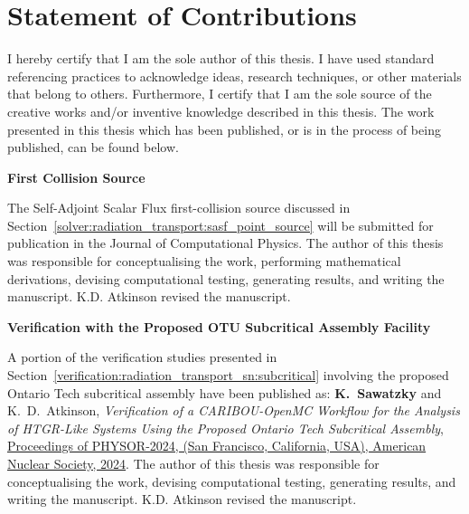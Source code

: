 \chapter*{Statement of Contributions}

I hereby certify that I am the sole author of this thesis. I have used standard referencing practices to acknowledge ideas, research techniques, or other materials that belong to others. Furthermore, I certify that I am the sole source of the creative works and/or inventive knowledge described in this thesis. The work presented in this thesis which has been published, or is in the process of being published, can be found below.

\noindent\textbf{First Collision Source}

The Self-Adjoint Scalar Flux first-collision source discussed in Section~\ref{solver:radiation_transport:sasf_point_source} will be submitted for publication in the Journal of Computational Physics. The author of this thesis was responsible for conceptualising the work, performing mathematical derivations, devising computational testing, generating results, and writing the manuscript. K.D. Atkinson revised the manuscript.

\noindent\textbf{Verification with the Proposed OTU Subcritical Assembly Facility}

A portion of the verification studies presented in Section~\ref{verification:radiation_transport_sn:subcritical} involving the proposed Ontario Tech subcritical assembly have been published as: \textbf{K.\ Sawatzky} and {K.\ D.\ Atkinson}, \textit{Verification of a CARIBOU-OpenMC Workflow for the Analysis of HTGR-Like Systems Using the Proposed Ontario Tech Subcritical Assembly}, \href{https://www.ans.org/meetings/physor2024/}{Proceedings of PHYSOR-2024, (San Francisco, California, USA), American Nuclear Society, 2024}. The author of this thesis was responsible for conceptualising the work, devising computational testing, generating results, and writing the manuscript. K.D. Atkinson revised the manuscript.
